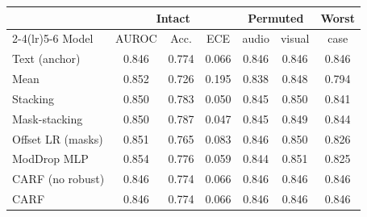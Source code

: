 \begin{tabular}{@{}lcccccc@{}}
\toprule
 & \multicolumn{3}{c}{Intact} & \multicolumn{2}{c}{Permuted} & Worst \\
\cmidrule(lr){2-4}\cmidrule(lr){5-6}
Model & AUROC & Acc. & ECE & audio & visual & case \\
\midrule
Text (anchor) & 0.846 & 0.774 & 0.066 & 0.846 & 0.846 & 0.846 \\
Mean & 0.852 & 0.726 & 0.195 & 0.838 & 0.848 & 0.794 \\
Stacking & 0.850 & 0.783 & 0.050 & 0.845 & 0.850 & 0.841 \\
Mask-stacking & 0.850 & 0.787 & 0.047 & 0.845 & 0.849 & 0.844 \\
Offset LR (masks) & 0.851 & 0.765 & 0.083 & 0.846 & 0.850 & 0.826 \\
ModDrop MLP & 0.854 & 0.776 & 0.059 & 0.844 & 0.851 & 0.825 \\
CARF (no robust) & 0.846 & 0.774 & 0.066 & 0.846 & 0.846 & 0.846 \\
CARF & 0.846 & 0.774 & 0.066 & 0.846 & 0.846 & 0.846 \\
\bottomrule
\end{tabular}
